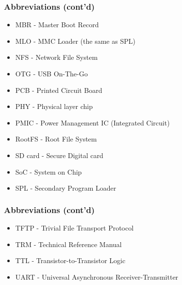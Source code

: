 \documentclass[aspectratio=169]{beamer}
\begin{document}
\begin{frame}
  \frametitle{Abbreviations (cont'd)}
  \begin{itemize}
    \item MBR - Master Boot Record
    \item MLO - MMC Loader (the same as SPL)
    \item NFS - Network File System
    \item OTG - USB On-The-Go
    \item PCB - Printed Circuit Board
    \item PHY - Physical layer chip
    \item PMIC - Power Management IC (Integrated Circuit)
    \item RootFS - Root File System
    \item SD card - Secure Digital card
    \item SoC - System on Chip
    \item SPL - Secondary Program Loader
  \end{itemize}
\end{frame}

\begin{frame}
  \frametitle{Abbreviations (cont'd)}
  \begin{itemize}
    \item TFTP - Trivial File Transport Protocol
    \item TRM - Technical Reference Manual
    \item TTL - Transistor-to-Transistor Logic
    \item UART - Universal Asynchronous Receiver-Transmitter
  \end{itemize}
\end{frame}
\end{document}
